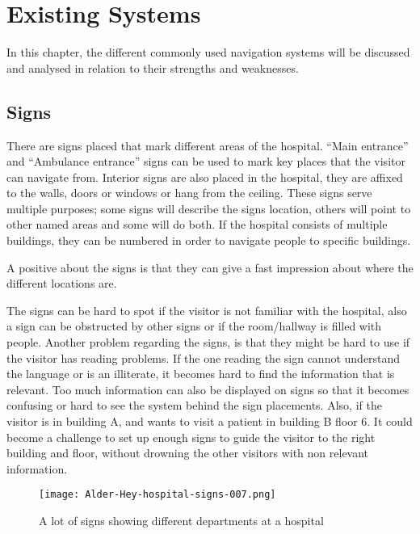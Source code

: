 \section{Existing Systems} %
\label{sec:existing_systems}
In this chapter, the different commonly used navigation systems will be discussed and analysed in relation to their strengths and weaknesses.

\subsection{Signs}
There are signs placed that mark different areas of the hospital. \enquote{Main entrance} and \enquote{Ambulance entrance}\cite{signs_hospital} signs can be used to mark key places that the visitor can navigate from\cite{art_Osborne}.
Interior signs are also placed in the hospital, they are affixed to the walls, doors or windows or hang from the ceiling. These signs serve multiple purposes; some signs will describe the signs location, others will point to other named areas and some will do both. 
If the hospital consists of multiple buildings, they can be numbered in order to navigate people to specific buildings.

A positive about the signs is that they can give a fast impression about where the different locations are.

The signs can be hard to spot if the  visitor is not familiar with the hospital, also a sign can be obstructed by other signs or if the room/hallway is filled with people. Another problem regarding the signs, is that they might be hard to use if the visitor has reading problems. If the one reading the sign cannot understand the language or is an illiterate, it becomes hard to find the information that is relevant\cite{signs_reading}. Too much information can also be displayed on signs so that it becomes confusing or hard to see the system behind the sign placements.
Also, if the visitor is in building A, and wants to visit a patient in building B floor 6. It could become a challenge to set up enough signs to guide the visitor to the right building and floor, without drowning the other visitors with non relevant information.

  \begin{figure}[ht!]
    \centering
    \texttt{[image: Alder-Hey-hospital-signs-007.png]}
    \caption{A lot of signs showing different departments at a hospital\cite{signs_hospital}}
    \label{overflow}
  \end{figure}

